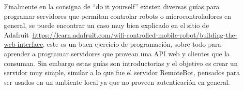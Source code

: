 
Finalmente en la consigna de ``do it yourself'' existen diversas guías para
programar servidores que permitan controlar robots o microcontroladores
en general, se puede encontrar un caso muy bien explicado en el sitio
de Adafruit~\url{https://learn.adafruit.com/wifi-controlled-mobile-robot/building-the-web-interface},
este es un buen ejercicio de programación, sobre todo para aprender a
programar servidores que provean una API web y clientes que la consuman. Sin
embargo estas guías son introductorias y el objetivo es crear un servidor
muy simple, similar a lo que fue el servidor RemoteBot, pensados para ser
usados en un ambiente local ya que no proveen autenticación en general.

